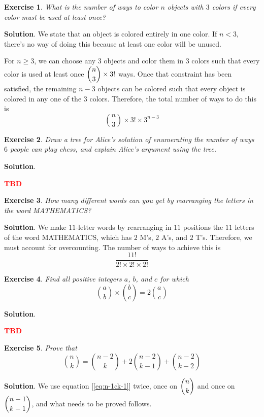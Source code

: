 \documentclass[11pt]{book}
\theoremstyle{definition}
\theoremstyle{plain}
\newtheorem{exercise}{Exercise}
\theoremstyle{definition}
\theoremstyle{problemstyle}
\theoremstyle{remark}
\theoremstyle{definition}
\newcommand{\tbd}{
    \vspace{5mm}
    \textbf{\textcolor{red}{\Large{TBD}}}
    \vspace{5mm}
}
\begin{document}
\begin{exercise}
    \label{ex:1.8.29}
    What is the number of ways to color $n$ objects with $3$ colors if every color must be used at least once?
\end{exercise}
\textbf{Solution}.
We state that an object is colored entirely in one color. If $n<3$, there's no way of doing this because at least one color will be unused.

For $n\geq3$, we can choose any $3$ objects and color them in $3$ colors such that every color is used at least once $\dbinom{n}{3}\times3!$ ways. Once that constraint has been satisfied, the remaining $n-3$ objects can be colored such that every object is colored in any one of the $3$ colors. Therefore, the total number of ways to do this is
\[
    \binom{n}{3}\times3!\times3^{n-3}
\]
\begin{exercise}
    \label{ex:1.8.30}
    Draw a tree for Alice's solution of enumerating the number of ways $6$ people can play chess, and explain Alice's argument using the tree.
\end{exercise}
\textbf{Solution}.

\tbd
\begin{exercise}
    \label{ex:1.8.31}
    How many different words can you get by rearranging the letters in the word MATHEMATICS?
\end{exercise}
\textbf{Solution}.
We make $11$-letter words by rearranging in $11$ positions the $11$ letters of the word MATHEMATICS, which has $2$ M's, $2$ A's, and $2$ T's. Therefore, we must account for overcounting. The number of ways to achieve this is
\[
    \frac{11!}{2!\times2!\times2!}
\]
\begin{exercise}
    \label{ex:1.8.32}
    Find all positive integers $a$, $b$, and $c$ for which
    \[
        \binom{a}{b}\times\binom{b}{c}=2\binom{a}{c}
    \]
\end{exercise}
\textbf{Solution}.
\tbd
\begin{exercise}
    \label{ex:1.8.33}
    Prove that
    \begin{equation}
        \label{eq:nckn-2ck}
        \binom{n}{k}=\binom{n-2}{k}+2\binom{n-2}{k-1}+\binom{n-2}{k-2}
    \end{equation}
\end{exercise}
\textbf{Solution}.
We use equation [\ref{eq:n-1ck-1}] twice, once on $\dbinom{n}{k}$ and once on $\dbinom{n-1}{k-1}$, and what needs to be proved follows.
\end{document}
